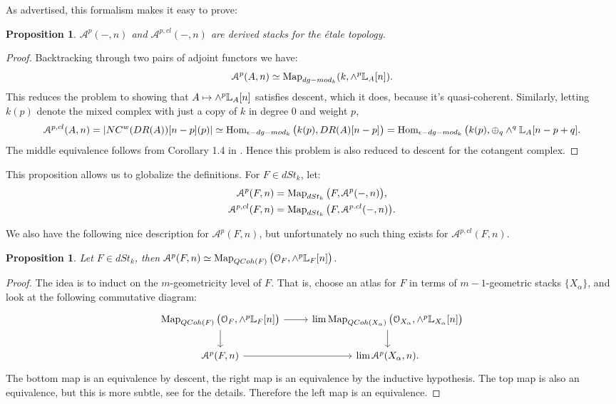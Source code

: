 \documentclass[10pt,a4paper,reqno,oneside]{book} %
\theoremstyle{plain}
\newtheorem{prop}[thm]{Proposition}
\theoremstyle{definition}
\theoremstyle{remark}
\numberwithin{equation}{section}
\begin{document}
As advertised, this formalism makes it easy to prove:
\begin{prop}
\label{prop:forms_descent}
$\mathcal{A}^p(-,n)$ and $\mathcal{A}^{p,cl}(-,n)$ are derived stacks for the \'etale topology.
\end{prop}
\begin{proof}
Backtracking through two pairs of adjoint functors we have:
\[	\mathcal{A}^p(A,n) \simeq \operatorname{Map}_{dg-mod_k}(k, \wedge^p\mathbb L_A[n]).	\]
This reduces the problem to showing that $A \mapsto \wedge^p\mathbb L_A[n]$ satisfies descent, which it does, because it's
quasi-coherent. Similarly, letting $k(p)$ denote the mixed complex with just a copy of $k$ in degree 0 and weight $p$,
\[	\mathcal{A}^{p,cl}(A,n) = |NC^w(DR(A))[n-p](p)| \simeq \operatorname{Hom}_{\epsilon-dg-mod_k}\big(k(p),DR(A)[n-p]\big)
= \operatorname{Hom}_{\epsilon-dg-mod_k} \big(k(p), \oplus_q \wedge^q \mathbb L_A[n-p+q].	\]
The middle equivalence follows from Corollary 1.4 in \cite{PTVV}. Hence this problem is also reduced to descent for the
cotangent complex.
\end{proof}

This proposition allows us to globalize the definitions. For $F\in dSt_k$, let:
\begin{align*}
\mathcal{A}^p(F,n) &= \operatorname{Map}_{dSt_k}\big(F,\mathcal{A}^p(-,n)\big), \\
\mathcal{A}^{p,cl}(F,n) &= \operatorname{Map}_{dSt_k}\big(F,\mathcal{A}^{p.cl}(-,n)\big).
\end{align*}

We also have the following nice description for $\mathcal{A}^p(F,n)$, but unfortunately no such thing exists for
$\mathcal{A}^{p,cl}(F,n)$.

\begin{prop}
\label{prop:forms_maps}
Let $F \in dSt_k$, then $\mathcal{A}^p(F,n) \simeq \operatorname{Map}_{QCoh(F)}\big(\mathcal{O}_F,\wedge^p\mathbb L_F[n]\big)$.
\end{prop}
\begin{proof}
The idea is to induct on the $m$-geometricity level of $F$. That is, choose an atlas for $F$ in terms of $m-1$-geometric
stacks $\{X_{\alpha}\}$, and look at the following commutative diagram:
\[
\begin{tikzcd}
\Map_{QCoh(F)}\big(\mathcal{O}_F,\wedge^p\bbL_F[n]\big) \arrow{d}\arrow{r} &
\lim \Map_{QCoh(X_{\alpha})}\big(\mathcal{O}_{X_{\alpha}},\wedge^p\bbL_{X_{\alpha}}[n]\big)\arrow{d} \\
\mathcal{A}^p(F,n) \arrow{r} & \lim \mathcal{A}^p(X_{\alpha},n) .
\end{tikzcd}
\]
The bottom map is an equivalence by descent, the right map is an equivalence by the inductive hypothesis. The top map
is also an equivalence, but this is more subtle, see \cite{PTVV} for the details. Therefore the left map is an equivalence.
\end{proof}
\end{document}
